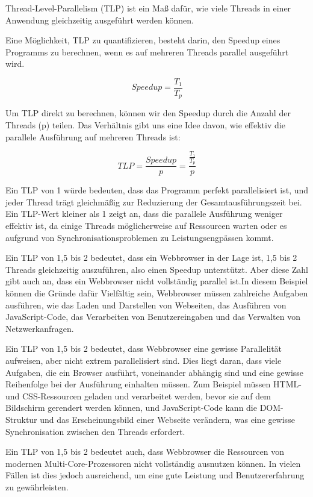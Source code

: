 Thread-Level-Parallelism (TLP) ist ein Maß dafür, wie viele Threads in einer Anwendung gleichzeitig ausgeführt werden können. 

Eine Möglichkeit, TLP zu quantifizieren, besteht darin, den Speedup eines Programms zu berechnen, wenn es auf mehreren Threads parallel ausgeführt wird.

\begin{equation}
    Speedup = \frac{T_1}{T_p}
\end{equation}

Um TLP direkt zu berechnen, können wir den Speedup durch die Anzahl der Threads (p) teilen. Das Verhältnis gibt uns eine Idee davon, wie effektiv die parallele Ausführung auf mehreren Threads ist:

\begin{equation}
    TLP = \frac{Speedup}{p} = \frac{\frac{T_1}{T_p}}{p}
\end{equation}

Ein TLP von 1 würde bedeuten, dass das Programm perfekt parallelisiert ist, und jeder Thread trägt gleichmäßig zur Reduzierung der Gesamtausführungszeit bei. Ein TLP-Wert kleiner als 1 zeigt an, dass die parallele Ausführung weniger effektiv ist, da einige Threads möglicherweise auf Ressourcen warten oder es aufgrund von Synchronisationsproblemen zu Leistungsengpässen kommt.

Ein TLP von 1,5 bis 2 bedeutet, dass ein Webbrowser in der Lage ist, 1,5 bis 2 Threads gleichzeitig auszuführen, also einen Speedup unterstützt. Aber diese Zahl gibt auch an, dass ein Webbrowser nicht vollständig parallel ist.In diesem Beispiel können die Gründe dafür Vielfältig sein, Webbrowser müssen zahlreiche Aufgaben ausführen, wie das Laden und Darstellen von Webseiten, das Ausführen von JavaScript-Code, das Verarbeiten von Benutzereingaben und das Verwalten von Netzwerkanfragen. 

Ein TLP von 1,5 bis 2 bedeutet, dass Webbrowser eine gewisse Parallelität aufweisen, aber nicht extrem parallelisiert sind. Dies liegt daran, dass viele Aufgaben, die ein Browser ausführt, voneinander abhängig sind und eine gewisse Reihenfolge bei der Ausführung einhalten müssen. Zum Beispiel müssen HTML- und CSS-Ressourcen geladen und verarbeitet werden, bevor sie auf dem Bildschirm gerendert werden können, und JavaScript-Code kann die DOM-Struktur und das Erscheinungsbild einer Webseite verändern, was eine gewisse Synchronisation zwischen den Threads erfordert.

Ein TLP von 1,5 bis 2 bedeutet auch, dass Webbrowser die Ressourcen von modernen Multi-Core-Prozessoren nicht vollständig ausnutzen können. In vielen Fällen ist dies jedoch ausreichend, um eine gute Leistung und Benutzererfahrung zu gewährleisten.

